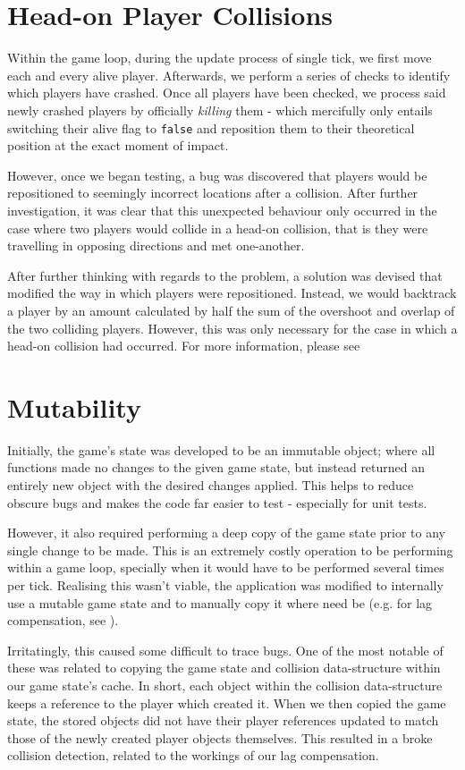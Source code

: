 \documentclass{standalone}
\begin{document}
	\section{Head-on Player Collisions}
		Within the game loop, during the update process of single tick, we first move each and every alive player. Afterwards, we perform a series of checks to identify which players have crashed. Once all players have been checked, we process said newly crashed players by officially \emph{killing} them - which mercifully only entails switching their alive flag to \texttt{false} and reposition them to their theoretical position at the exact moment of impact.

		However, once we began testing, a bug was discovered that players would be repositioned to seemingly incorrect locations after a collision. After further investigation, it was clear that this unexpected behaviour only occurred in the case where two players would collide in a head-on collision, that is they were travelling in opposing directions and met one-another.

		After further thinking with regards to the problem, a solution was devised that modified the way in which players were repositioned. Instead, we would backtrack a player by an amount calculated by half the sum of the overshoot and overlap of the two colliding players. However, this was only necessary for the case in which a head-on collision had occurred. For more information, please see 

	\section{Mutability}
		Initially, the game's state was developed to be an immutable object; where all functions made no changes to the given game state, but instead returned an entirely new object with the desired changes applied. This helps to reduce obscure bugs and makes the code far easier to test - especially for unit tests.

		However, it also required performing a deep copy of the game state prior to any single change to be made. This is an extremely costly operation to be performing within a game loop, specially when it would have to be performed several times per tick. Realising this wasn't viable, the application was modified to internally use a mutable game state and to manually copy it where need be (e.g. for lag compensation, see ).

		Irritatingly, this caused some difficult to trace bugs. One of the most notable of these was related to copying the game state and collision data-structure within our game state's cache. In short, each object within the collision data-structure keeps a reference to the player which created it. When we then copied the game state, the stored objects did not have their player references updated to match those of the newly created player objects themselves. This resulted in a broke collision detection, related to the workings of our lag compensation.
\end{document}
